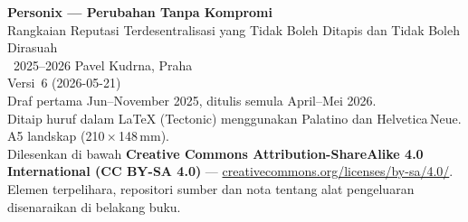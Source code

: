 \thispagestyle{empty}
\ifdefined\printmode\vspace*{\fill}\else{}\fi
\begin{flushleft}\small\sffamily
\textbf{Personix --- Perubahan Tanpa Kompromi}\\[0.3em]
Rangkaian Reputasi Terdesentralisasi yang Tidak Boleh Ditapis dan Tidak Boleh Dirasuah\\[1.4em]

\textcopyright\ 2025--2026 Pavel Kudrna, Praha\\[0.4em]

Versi~6 (2026-05-21)\\
Draf pertama Jun--November 2025, ditulis semula April--Mei 2026.\\[1.4em]

Ditaip huruf dalam \LaTeX{} (Tectonic) menggunakan Palatino dan Helvetica\,Neue.\\
A5 landskap (210\,$\times$\,148\,mm).\\[1.4em]

Dilesenkan di bawah \textbf{Creative Commons Attribution-ShareAlike 4.0
International (CC BY-SA 4.0)} ---
\href{https://creativecommons.org/licenses/by-sa/4.0/}{creativecommons.org/licenses/by-sa/4.0/}.
Elemen terpelihara, repositori sumber dan nota tentang alat pengeluaran
disenaraikan di belakang buku.
\end{flushleft}
\ifdefined\printmode\else{}\fi
\clearpage

